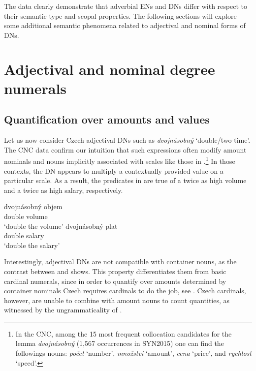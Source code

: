 \documentclass[output=paper,
modfonts,
hidelinks,
newtxmath
]{langscibook}
\begin{document}
\noindent The data clearly demonstrate that adverbial ENs and DNs differ with respect to their semantic type and scopal properties. The following sections will explore some additional semantic phenomena related to adjectival and nominal forms of DNs.

\section{Adjectival and nominal degree numerals}\label{adjectival-and-nominal-degree-numerals}

\subsection{Quantification over amounts and values}\label{quantification-over-amounts}

Let us now consider Czech adjectival DNs such as \textit{dvojnásobný} `double/two-time'. The CNC data confirm our intuition that such expressions often modify amount nominals and nouns implicitly associated with scales like those in .\footnote{In the CNC, among the 15 most frequent collocation candidates for the lemma \textit{dvojnásobný} (1,567 occurrences in SYN2015) one can find the followings nouns: \textit{počet} `number', \textit{množství} `amount', \textit{cena} `price', and \textit{rychlost} `speed'.} In those contexts, the DN appears to multiply a contextually provided value on a particular scale. As a result, the predicates in  are true of a twice as high volume and a twice as high salary, respectively.

\ea\label{dvojnasobny-amount-scales} \ea \gll dvojnásobný objem\label{dvojnasobny-objem}\\
double volume\\
\glt `double the volume'
\ex \gll dvojnásobný plat\\
double salary\\
\glt `double the salary'
\z  \z

\noindent Interestingly, adjectival DNs are not compatible with container nouns, as the contrast between  and  shows. This property differentiates them from basic cardinal numerals, since in order to quantify over amounts determined by container nominals Czech requires cardinals to do the job, see . Czech cardinals, however, are unable to combine with amount nouns to count quantities, as witnessed by the ungrammaticality of .
\end{document}
